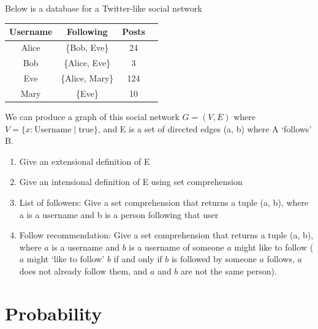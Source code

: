 \documentclass[twocolumn]{article}
\begin{document}
\subsection{}

    Below is a database for a Twitter-like social network

    \begin{table}[h!]
        \centering
        \begin{tabular}{c | c | c | c }
            \toprule
            Username & Following & Posts \\
            \midrule
            Alice & \{Bob, Eve\} & 24 \\
            Bob & \{Alice, Eve\} & 3  \\
            Eve & \{Alice, Mary\} & 124 \\
            Mary & \{Eve\} & 10 \\
            \bottomrule
        \end{tabular}
    \end{table}

    We can produce a graph of this social network $ G = ( V, E)$ where $ V = \{ x : \text{Username} \mid \text{true} \}$, and E is a set of directed edges (a, b) where A `follows' B.

    \begin{enumerate}
        \item Give an extensional definition of E
        \item Give an intensional definition of E using set comprehension
        \item List of followers: Give a set comprehension that returns a tuple (a, b), where a is a username and b is a person following that user
        \item Follow recommendation: Give a set comprehension that returns a tuple (a, b), where $a$ is a username and $b$ is a username of someone $a$ might like to follow ($a$ might `like to follow' $b$ if and only if $b$ is followed by someone $a$ follows, $a$ does not already follow them, and $a$ and $b$ are not the same person).
    \end{enumerate}


\clearpage
\section{Probability}

\subsection{}
\end{document}
